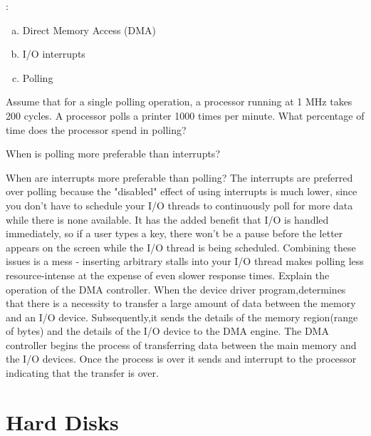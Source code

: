 \begin{ExerciseList}
\Answer:
\begin{enumerate}[(a) ]
  \item Direct Memory Access (DMA)
  \item I/O interrupts
  \item Polling
\end{enumerate}

\Exercise
Assume that for a single polling operation, a processor running at 1 MHz takes 200 cycles. 
A processor polls a printer 1000 times per minute. What percentage of time does the processor
spend in polling?

\Exercise
When is polling more preferable than interrupts?
\Answer

\Exercise
When are interrupts more preferable than polling?
\Answer
The interrupts are preferred over polling because the "disabled" effect of using interrupts is much lower, since you don't have to schedule your I/O threads to continuously poll for more data while there is none available. It has the added benefit that I/O is handled immediately, so if a user types a key, there won't be a pause before the letter appears on the screen while the I/O thread is being scheduled. Combining these issues is a mess - inserting arbitrary stalls into your I/O thread makes polling less resource-intense at the expense of even slower response times. 
\Exercise
Explain the operation of the DMA controller.
\Answer
When the device driver program,determines that there is a necessity to transfer a large amount of data between the memory and an I/O device. Subsequently,it sends the details of the memory region(range of bytes) and the details of the I/O device to the DMA engine. The DMA controller begins the process of transferring data between the main memory and the I/O devices. Once the process is over it sends and interrupt to the processor indicating that the transfer is over.

\end{ExerciseList}


\section*{Hard Disks}

